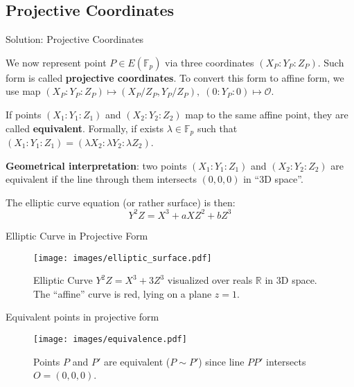 \documentclass[xcolor={usenames,dvipsnames}]{beamer}
\begin{document}
    \subsection{Projective Coordinates}
    \begin{frame}{Solution: Projective Coordinates}
        \begin{definition}
            We now represent point $P \in E(\mathbb{F}_p)$ via three coordinates $(X_P:Y_P:Z_P)$. Such form is called \textbf{projective coordinates}. To convert this form to affine form, we use map $(X_P:Y_P:Z_P) \mapsto (X_P/Z_P,Y_P/Z_P),\; (0:Y_P:0) \mapsto \mathcal{O}$.
        \end{definition}
        \pause
        \begin{definition}
            If points $(X_1:Y_1:Z_1)$ and $(X_2:Y_2:Z_2)$ map to the same affine point, they are called \textbf{equivalent}. Formally, if exists $\lambda \in \mathbb{F}_p$ such that $(X_1:Y_1:Z_1)=(\lambda X_2:\lambda Y_2:\lambda Z_2)$.
        \end{definition}
        \pause
        
        \textbf{Geometrical interpretation}: two points $(X_1:Y_1:Z_1)$ and $(X_2:Y_2:Z_2)$ are equivalent if the line through them intersects $(0,0,0)$ in ``3D space''.

        \pause The elliptic curve equation (or rather surface) is then:
        \begin{equation*}
            \boxed{Y^2Z = X^3 + aXZ^2 + bZ^3}
        \end{equation*}
    \end{frame}

    \begin{frame}{Elliptic Curve in Projective Form}	
        \begin{figure}
            \centering
            \texttt{[image: images/elliptic\_surface.pdf]}
            \caption{Elliptic Curve $Y^2Z = X^3 + 3Z^3$ visualized over reals $\mathbb{R}$ in 3D space. The ``affine'' curve is red, lying on a plane $z=1$.}
        \end{figure}
    \end{frame}
    
    \begin{frame}{Equivalent points in projective form}	
        \begin{figure}
            \centering
            \texttt{[image: images/equivalence.pdf]}
            \caption{Points $P$ and $P'$ are equivalent ($P \sim P'$) since line $PP'$ intersects $O=(0,0,0)$.}
        \end{figure}
    \end{frame}
\end{document}

